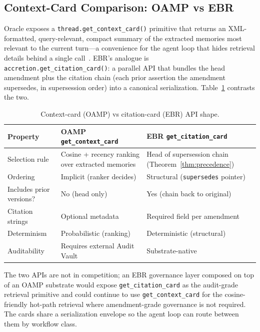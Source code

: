 \documentclass[runningheads]{llncs}
\begin{document}
\subsection{Context-Card Comparison: OAMP vs EBR}
\label{sec:citation-card}

Oracle exposes a \texttt{thread.get\_context\_card()} primitive that
returns an XML-formatted, query-relevant, compact summary of the
extracted memories most relevant to the current turn---a convenience for
the agent loop that hides retrieval details behind a single
call~\cite{oracleOAMP2026}. EBR's analogue is
\texttt{accretion.get\_citation\_card()}: a parallel API that bundles
the head amendment plus the citation chain (each prior assertion the
amendment supersedes, in supersession order) into a canonical
serialization. Table~\ref{tab:context-vs-citation} contrasts the two.

\begin{table}[h]
\centering
\caption{Context-card (OAMP) vs citation-card (EBR) API shape.}
\label{tab:context-vs-citation}
\small
\begin{tabular}{p{}p{}p{}}
\toprule
\textbf{Property} & \textbf{OAMP \texttt{get\_context\_card}} & \textbf{EBR \texttt{get\_citation\_card}} \\
\midrule
Selection rule & Cosine + recency ranking over extracted memories & Head of supersession chain (Theorem~\ref{thm:precedence}) \\
Ordering & Implicit (ranker decides) & Structural (\texttt{supersedes} pointer) \\
Includes prior versions? & No (head only) & Yes (chain back to original) \\
Citation strings & Optional metadata & Required field per amendment \\
Determinism & Probabilistic (ranking) & Deterministic (structural) \\
Auditability & Requires external Audit Vault & Substrate-native \\
\bottomrule
\end{tabular}
\end{table}

The two APIs are not in competition; an EBR governance layer composed
on top of an OAMP substrate would expose \texttt{get\_citation\_card}
as the audit-grade retrieval primitive and could continue to use
\texttt{get\_context\_card} for the cosine-friendly hot-path retrieval
where amendment-grade governance is not required. The cards share a
serialization envelope so the agent loop can route between them by
workflow class.
\end{document}
